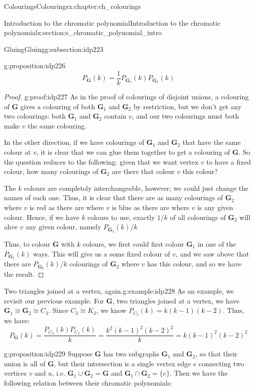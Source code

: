 \documentclass[oneside,10pt,]{book}
\numberwithin{equation}{section}
\newcommand{\bfG}{\mathbf{G}}
\begin{document}
\begin{chapterptx}{Colourings}{}{Colourings}{}{}{x:chapter:ch_colourings}
\begin{sectionptx}{Introduction to the chromatic polynomial}{}{Introduction to the chromatic polynomial}{}{}{x:section:s_chromatic_polynomial_intro}
\begin{subsectionptx}{Gluing}{}{Gluing}{}{}{g:subsection:idp223}
\begin{proposition}{}{}{g:proposition:idp226}
%
\begin{equation*}
P_{\bfG}(k)=\frac{1}{k}P_{\bfG_1}(k)P_{\bfG_2}(k)
\end{equation*}
\end{proposition}
\begin{proof}{}{g:proof:idp227}
As in the proof of colourings of disjoint unions, a colouring of \(\bfG\) gives a colouring of both \(\bfG_1\) and \(\bfG_2\) by restriction, but we don't get any two colourings: both \(\bfG_1\) and \(\bfG_2\) contain \(v\), and our two colourings must both make \(v\) the same colouring.%
\par
In the other direction, if we have colourings of \(\bfG_1\) and \(\bfG_2\) that have the same colour at \(v\), it is clear that we can glue them together to get a colouring of \(\bfG\).  So the question reduces to the following: given that we want vertex \(v\) to have a fixed colour, how many colourings of \(\bfG_2\) are there that colour \(v\) this colour?%
\par
The \(k\) colours are completely interchangeable, however; we could just change the names of each one.  Thus, it is clear that there are as many colourings of \(\bfG_2\) where \(v\) is red as there are where \(v\) is blue as there are where \(v\) is any given colour.  Hence, if we have \(k\) colours to use, exactly \(1/k\) of all colourings of \(\bfG_2\) will ahve \(v\) any given colour, namely \(P_{\bfG_2}(k)/k\)%
\par
Thus, to colour \(\bfG\) with \(k\) colours, we first could first colour \(\bfG_1\) in one of the \(P_{\bfG_1}(k)\) ways.  This will give us a some fixed colour of \(v\), and we saw above that there are \(P_{\bfG_2}(k)/k\) colourings of \(\bfG_2\) where \(v\) has this colour, and so we have the result.%
\end{proof}
\begin{example}{Two triangles joined at a vertex, again.}{g:example:idp228}%
As an example, we revisit our previous example.  For \(\bfG\), two triangles joined at a vertex, we have \(\bfG_1\cong \bfG_2\cong C_3\).  Since \(C_3\cong K_3\), we know \(P_{C_3}(k)=k(k-1)(k-2)\).  Thus, we have:%
%
\begin{equation*}
P_\bfG(k)=\frac{P_{C_3}(k)P_{C_3}(k)}{k}=\frac{k^2(k-1)^2(k-2)^2}{k}=k(k-1)^2(k-2)^2
\end{equation*}
\end{example}
\begin{proposition}{}{}{g:proposition:idp229}%
Suppose \(\bfG\) has two subgraphs \(\bfG_1\) and \(\bfG_2\), so that their union is all of \(\bfG\), but their intersection is a single vertex edge \(e\) connecting two vertices \(v\) and \(u\), i.e. \(\bfG_1\cup\bfG_2=\bfG\) and \(\bfG_1\cap\bfG_2=\{e\}\).  Then we have the following relation between their chromatic polynomials:%

\end{proposition}
\end{subsectionptx}
\end{sectionptx}
\end{chapterptx}
\end{document}

